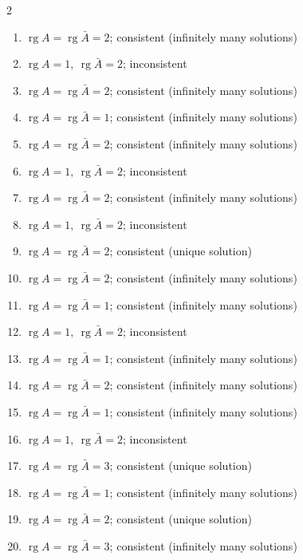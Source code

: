 \begin{multicols}{2}\raggedright
\begin{enumerate}[label=\arabic*., leftmargin=*, itemsep=1pt]
\item $\operatorname{rg}A=\operatorname{rg}\bar A=2$; consistent (infinitely many solutions)
\item $\operatorname{rg}A=1,\ \operatorname{rg}\bar A=2$; inconsistent
\item $\operatorname{rg}A=\operatorname{rg}\bar A=2$; consistent (infinitely many solutions)
\item $\operatorname{rg}A=\operatorname{rg}\bar A=1$; consistent (infinitely many solutions)
\item $\operatorname{rg}A=\operatorname{rg}\bar A=2$; consistent (infinitely many solutions)
\item $\operatorname{rg}A=1,\ \operatorname{rg}\bar A=2$; inconsistent
\item $\operatorname{rg}A=\operatorname{rg}\bar A=2$; consistent (infinitely many solutions)
\item $\operatorname{rg}A=1,\ \operatorname{rg}\bar A=2$; inconsistent
\item $\operatorname{rg}A=\operatorname{rg}\bar A=2$; consistent (unique solution)
\item $\operatorname{rg}A=\operatorname{rg}\bar A=2$; consistent (infinitely many solutions)
\item $\operatorname{rg}A=\operatorname{rg}\bar A=1$; consistent (infinitely many solutions)
\item $\operatorname{rg}A=1,\ \operatorname{rg}\bar A=2$; inconsistent
\item $\operatorname{rg}A=\operatorname{rg}\bar A=1$; consistent (infinitely many solutions)
\item $\operatorname{rg}A=\operatorname{rg}\bar A=2$; consistent (infinitely many solutions)
\item $\operatorname{rg}A=\operatorname{rg}\bar A=1$; consistent (infinitely many solutions)
\item $\operatorname{rg}A=1,\ \operatorname{rg}\bar A=2$; inconsistent
\item $\operatorname{rg}A=\operatorname{rg}\bar A=3$; consistent (unique solution)
\item $\operatorname{rg}A=\operatorname{rg}\bar A=1$; consistent (infinitely many solutions)
\item $\operatorname{rg}A=\operatorname{rg}\bar A=2$; consistent (unique solution)
\item $\operatorname{rg}A=\operatorname{rg}\bar A=3$; consistent (infinitely many solutions)

\end{enumerate}
\end{multicols}
